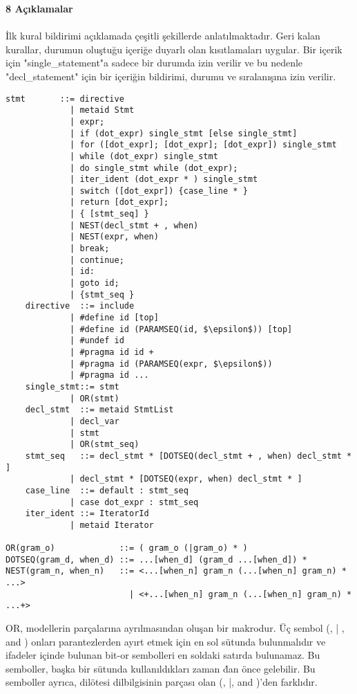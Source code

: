 \documentclass[a4paper,20pt, right=2cm]{article}
\begin{document}
\textbf{8 Açıklamalar}\\
\\
İlk kural bildirimi açıklamada çeşitli şekillerde anlatılmaktadır. Geri kalan kurallar, durumun oluştuğu içeriğe duyarlı olan kısıtlamaları uygular. Bir içerik için "single\_statement"a sadece bir durumda izin verilir ve bu nedenle "decl\_statement" için bir içeriğin bildirimi, durumu ve sıralanışına  izin verilir.\\ 
\begin{lstlisting}[mathescape]
	stmt       ::= directive
		     | metaid Stmt
		     | expr;
		     | if (dot_expr) single_stmt [else single_stmt]
		     | for ([dot_expr]; [dot_expr]; [dot_expr]) single_stmt
		     | while (dot_expr) single_stmt
		     | do single_stmt while (dot_expr);
		     | iter_ident (dot_expr * ) single_stmt
		     | switch ([dot_expr]) {case_line * }
		     | return [dot_expr];
		     | { [stmt_seq] }
		     | NEST(decl_stmt + , when)
		     | NEST(expr, when)
		     | break;
		     | continue;
		     | id:
		     | goto id;
		     | {stmt_seq }
	directive  ::= include
		     | #define id [top]
		     | #define id (PARAMSEQ(id, $\epsilon$)) [top]
		     | #undef id
		     | #pragma id id +
		     | #pragma id (PARAMSEQ(expr, $\epsilon$))
		     | #pragma id ...
	single_stmt::= stmt
		     | OR(stmt)
	decl_stmt  ::= metaid StmtList
		     | decl_var
		     | stmt
		     | OR(stmt_seq)
	stmt_seq   ::= decl_stmt * [DOTSEQ(decl_stmt + , when) decl_stmt * ]
		     | decl_stmt * [DOTSEQ(expr, when) decl_stmt * ]
	case_line  ::= default : stmt_seq
		     | case dot_expr : stmt_seq
	iter_ident ::= IteratorId
		     | metaid Iterator

OR(gram_o)             ::= ( gram_o (|gram_o) * )
DOTSEQ(gram_d, when_d) ::= ...[when_d] (gram_d ...[when_d]) *
NEST(gram_n, when_n)   ::= <...[when_n] gram_n (...[when_n] gram_n) * ...>
                         | <+...[when_n] gram_n (...[when_n] gram_n) * ...+>
\end{lstlisting}
OR, modellerin parçalarına ayrılmasından oluşan bir makrodur. Üç sembol (, | , and ) onları parantezlerden ayırt etmek için en sol sütunda bulunmalıdır ve ifadeler içinde bulunan bit-or sembolleri en soldaki satırda bulunamaz. Bu semboller, başka bir sütunda kullanıldıkları zaman \'dan önce gelebilir. Bu semboller ayrıca, dilötesi dilbilgisinin parçası olan (, |, and )'den farklıdır.
\end{document}
